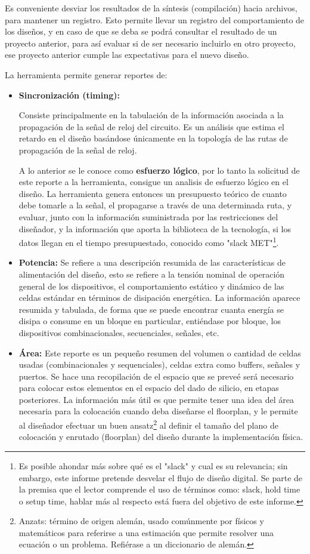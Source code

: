 Es conveniente desviar los resultados de la síntesis (compilación) hacia archivos, para mantener un registro. Esto permite llevar un registro del comportamiento de los diseños, y en caso de que se deba se podrá consultar el resultado de un proyecto anterior, para así evaluar si de ser necesario incluirlo en otro proyecto, ese proyecto anterior cumple las expectativas para el nuevo diseño.

La herramienta permite generar reportes de:

\begin{itemize}
\item \textbf{Sincronización (timing):} {Consiste principalmente en la tabulación de la información asociada a la propagación de la señal de reloj del circuito. Es un análisis que estima el retardo en el diseño basándose únicamente en la topología de las rutas de propagación de la señal de reloj.

A lo anterior se le conoce como \textbf{esfuerzo lógico}, por lo tanto la solicitud de este reporte a la herramienta, consigue un analisis de esfuerzo lógico en el diseño. La herramienta genera entonces un presupuesto teórico de cuanto debe tomarle a la señal, el propagarse a través de una determinada ruta, y evaluar, junto con la información suministrada por las restricciones del diseñador, y la información que aporta la biblioteca de la tecnología, si los datos llegan en el tiempo presupuestado, conocido como "slack MET"\footnote{Es posible ahondar más sobre qué es el "slack" y cual es su relevancia; sin embargo, este informe pretende desvelar el flujo de diseño digital. Se parte de la premisa que el lector comprende el uso de términos como: slack, hold time o setup time, hablar más al respecto está fuera del objetivo de este informe.}.}

\item \textbf{Potencia:} {Se refiere a una descripción resumida de las características de alimentación del diseño, esto se refiere a la tensión nominal de operación general de los dispositivos, el comportamiento estático y dinámico de las celdas estándar en términos de disipación energética. La información aparece resumida y tabulada, de forma que se puede encontrar cuanta energía se disipa o consume en un bloque en particular, entiéndase por bloque, los dispositivos combinacionales, secuenciales, señales, etc. }

\item \textbf{Área:} {Este reporte es un pequeño resumen del volumen o cantidad de celdas usadas (combinacionales y sequenciales), celdas extra como buffers, señales y puertos. Se hace una recopilación de el espacio que se preveé será necesario para colocar estos elementos en el espacio del dado de silicio, en etapas posteriores. La información más útil es que permite tener una idea del área necesaria para la colocación cuando deba diseñarse el floorplan, y le permite al diseñador efectuar un buen ansatz\footnote{Anzats: término de origen alemán, usado comúnmente por físicos y matemáticos para referirse a una estimación que permite resolver una ecuación o un problema. Refiérase a un diccionario de alemán.} al definir el tamaño del plano de colocación y enrutado (floorplan) del diseño durante la implementación física.}


\end{itemize}
